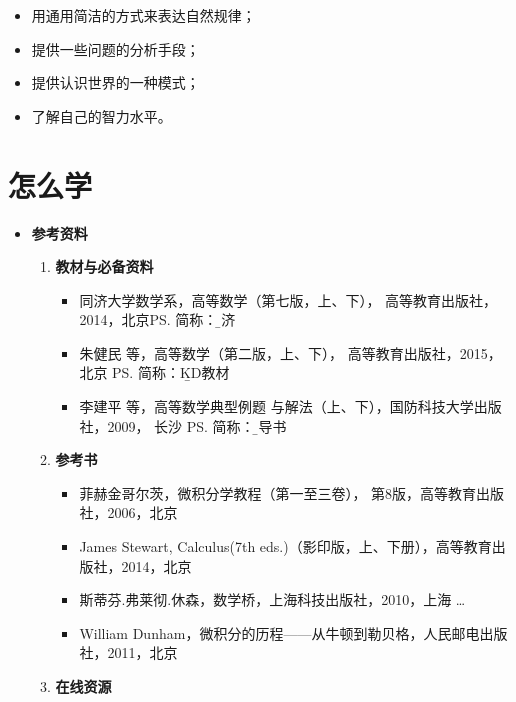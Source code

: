 \begin{itemize}
	\setlength{\itemindent}{1cm}
	\item {用通用简洁的方式来表达自然规律；}
	\item {提供一些问题的分析手段；}
	\item {提供认识世界的一种模式；}
	\item {了解自己的智力水平。}
\end{itemize}

\section{怎么学}

\begin{itemize}
	\item {\bf 参考资料}
  	\begin{enumerate}
		\item {\bf 教材与必备资料}
	  	\begin{itemize}
	  	  \item {同济大学数学系，高等数学（第七版，上、下），
	  	  高等教育出版社，2014，北京}\ps{简称：\b 同济}  
	  	  \item {朱健民 等，高等数学（第二版，上、下），
	  	  高等教育出版社，2015，北京}
	  	  \ps{简称：\b KD教材} 
	      \item {李建平 等，高等数学典型例题
	      与解法（上、下），国防科技大学出版社，2009，}
	      {长沙}
	      \ps{简称：\b 辅导书} 
	  	\end{itemize}
  		\item {\bf 参考书} 
  		\begin{itemize}
	    	\item 菲赫金哥尔茨，微积分学教程（第一至三卷），
	    	第8版，高等教育出版社，2006，北京
	    	\item James Stewart, Calculus(7th eds.)（影印版，上、下册），高等教育出版社，2014，北京
	    	\item 斯蒂芬.弗莱彻.休森，数学桥，上海科技出版社，2010，上海
	    	\ldots{} 
	    	\item William Dunham，微积分的历程——从牛顿到勒贝格，人民邮电出版社，2011，北京
  		\end{itemize}
  		\item {\bf 在线资源}

\end{enumerate}
\end{itemize}
